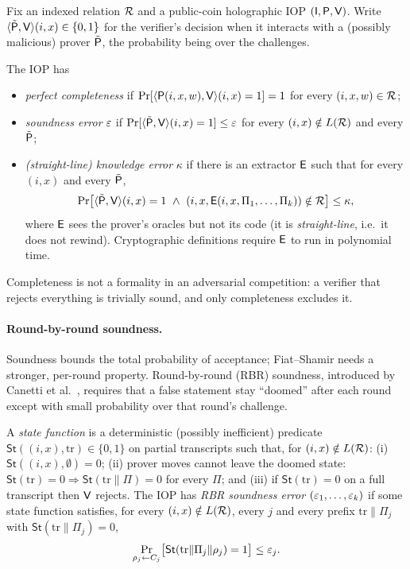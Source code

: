 Fix an indexed relation $\mathcal{R}$ and a public-coin holographic IOP $(\mathsf{I},\mathsf{P},\mathsf{V})$. Write
$\langle \tilde{\mathsf{P}},\mathsf{V}\rangle(i,x)\in\{0,1\}$ for the verifier's decision when it interacts
with a (possibly malicious) prover $\tilde{\mathsf{P}}$, the probability being over the challenges.

\begin{definition}\label{def:bg-ks}
The IOP has
\begin{itemize}[nosep]
  \item \emph{perfect completeness} if $\Pr[\langle\mathsf{P}(i,x,w),\mathsf{V}\rangle(i,x)=1]=1$ for every
    $(i,x,w)\in\mathcal{R}$;
  \item \emph{soundness error} $\varepsilon$ if $\Pr[\langle\tilde{\mathsf{P}},\mathsf{V}\rangle(i,x)=1]\le\varepsilon$ for
    every $(i,x)\notin L(\mathcal{R})$ and every $\tilde{\mathsf{P}}$;
  \item \emph{(straight-line) knowledge error} $\kappa$ if there is an extractor $\mathsf{E}$ such that for
    every $(i,x)$ and every $\tilde{\mathsf{P}}$,
    \[ \Pr\bigl[\langle\tilde\Prv,\Vrf\rangle(i,x)=1 \ \wedge\ (i,x,\Ext(i,x,\Pi_1,\dots,\Pi_k))\notin\R\bigr]\le\kappa, \]
    where $\mathsf{E}$ sees the prover's oracles but not its code (it is \emph{straight-line}, i.e.\ it
    does not rewind). Cryptographic definitions require $\mathsf{E}$ to run in polynomial time.
\end{itemize}
\end{definition}

Completeness is not a formality in an adversarial competition: a verifier that rejects
everything is trivially sound, and only completeness excludes it.

\paragraph{Round-by-round soundness.} Soundness bounds the total probability of acceptance;
Fiat--Shamir needs a stronger, per-round property. Round-by-round (RBR) soundness, introduced by
Canetti et al.\ \cite{CCHLRRW19}, requires that a false statement stay ``doomed'' after each
round except with small probability over that round's challenge.

\begin{definition}\label{def:bg-rbr}
A \emph{state function} is a deterministic (possibly inefficient) predicate
$\mathsf{St}((i,x),\mathrm{tr})\in\{0,1\}$ on partial transcripts such that, for $(i,x)\notin L(\mathcal{R})$:
(i) $\mathsf{St}((i,x),\emptyset)=0$; (ii) prover moves cannot leave the doomed state:
$\mathsf{St}(\mathrm{tr})=0\Rightarrow\mathsf{St}(\mathrm{tr}\|\Pi)=0$ for every $\Pi$; and
(iii) if $\mathsf{St}(\mathrm{tr})=0$ on a full transcript then $\mathsf{V}$ rejects. The IOP has
\emph{RBR soundness error} $(\varepsilon_1,\dots,\varepsilon_k)$ if some state function satisfies, for every
$(i,x)\notin L(\mathcal{R})$, every $j$ and every prefix $\mathrm{tr}\|\Pi_j$ with
$\mathsf{St}(\mathrm{tr}\|\Pi_j)=0$,
\[ \Pr_{\rho_j\leftarrow C_j}\bigl[\mathsf{St}(\mathrm{tr}\|\Pi_j\|\rho_j)=1\bigr]\le\varepsilon_j . \]
\end{definition}

